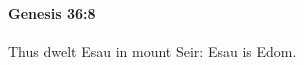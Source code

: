 
		\paragraph{Genesis 36:8} %
			\label{GENESIS-36-8}

			Thus dwelt Esau in mount Seir: Esau is Edom.


